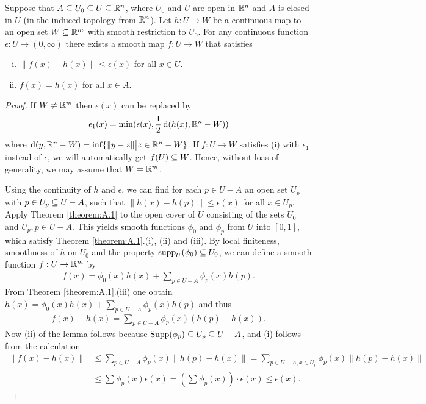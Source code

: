 \begin{lemma}\label{lemma:A.9}
  Suppose that $A\subseteq U_0\subseteq U\subseteq \mathbb{R}^n$, where $U_0$ and $U$ are open in
$\mathbb{R}^n$ and $A$ is closed in $U$ (in the induced topology from $\mathbb{R}^n$). Let $h:U\to W$ be
a continuous map to an open set $W\subseteq\mathbb{R}^m$ with smooth restriction to $U_0$. For
any continuous function $\epsilon:U\to (0, \infty)$ there exists a smooth map $f:U\to W$ that
satisfies
\begin{enumerate}[(i)]
  \item $\|f(x)-h(x)\|\le \epsilon(x)$ for all $x\in U$.
  \item $f(x) = h(x)$ for all $x\in A$.
\end{enumerate}
\end{lemma}

\begin{proof}
  If $W\neq \mathbb{R}^m$ then $\epsilon(x)$ can be replaced by  
  \begin{align*}
    \epsilon_1(x) = \min(\epsilon(x), \frac12\dd(h(x), \RR^n-W))
  \end{align*}
  where $\dd(y, \RR^n-W) = \inf\{\|y-z\|\big| z\in\RR^n-W\}$. If $f:U\to W$ satisfies (i) with 
  $\epsilon_1$ instead of $\epsilon$, we will automatically get $f(U)\subseteq W$. Hence, without loas of generality,
  we may assume that $W = \mathbb{R}^m$.
  
  Using the continuity of $h$ and $\epsilon$, we can find for each $p\in U-A$ an open set 
  $U_p$ with $p\in U_p\subseteq U-A$, such that $\|h(x) - h(p)\|\le \epsilon(x)$ for all $x\in U_p$.
  Apply Theorem \ref{theorem:A.1} to the open cover of $U$ consisting of the sets $U_0$ and $U_p, p\in U-A$.
  This yields smooth functions $\phi_0$ and $\phi_p$ from $U$ into $[0,1]$, which satisfy Theorem
  \ref{theorem:A.1}.(i), (ii) and (iii). By local finiteness, smoothness of $h$ on $U_0$ and the property
  $\operatorname{supp}_U(\phi_0) \subseteq U_0$, we can define a smooth function $f:U\to\mathbb{R}^m$ by
  \begin{align*}
    f(x) = \phi_0(x)h(x) + \sum_{p\in U-A}\phi_p(x)h(p).
  \end{align*}
  From Theorem \ref{theorem:A.1}.(iii) one obtain $h(x) = \phi_0(x)h(x) + \sum_{p\in U-A}\phi_p(x)h(p)$ and 
  thus 
  \begin{align*}
    f(x) - h(x) = \sum_{p\in U-A}\phi_p(x)(h(p)-h(x)).
  \end{align*}
  Now (ii) of the lemma follows because $\mathrm{Supp}(\phi_p)\subseteq U_p\subseteq U-A$, and (i) follows from the calculation
  \begin{align*}
    \|f(x) - h(x)\|
      & \le \sum_{p\in U-A}\phi_p(x)\|h(p)-h(x)\|
        = \sum_{p\in U-A, x\in U_p}\phi_p(x)\|h(p)-h(x)\| \\
      & \le \sum_{}^{}{\phi_p(x)\epsilon(x)} 
        = \left(\sum_{}^{}{\phi_p(x)}\right)\cdot \epsilon(x)
        \le \epsilon(x).
  \end{align*}
\end{proof}